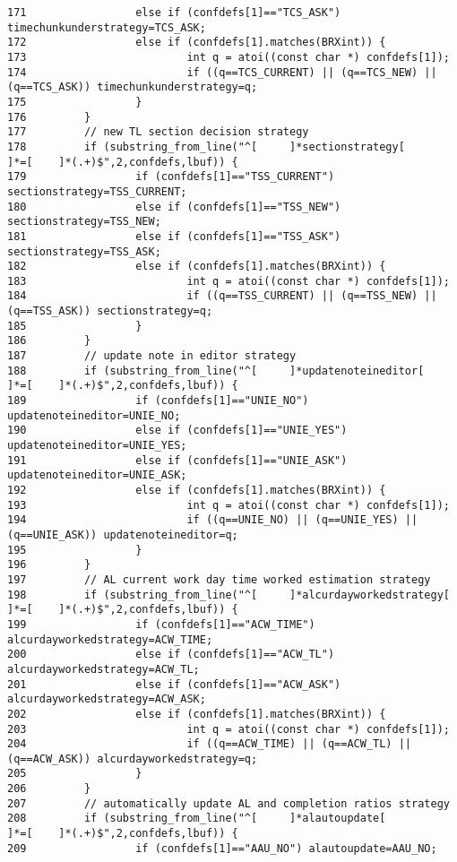 \begin{verbatim}
171                 else if (confdefs[1]=="TCS_ASK") timechunkunderstrategy=TCS_ASK;
172                 else if (confdefs[1].matches(BRXint)) {
173                         int q = atoi((const char *) confdefs[1]);
174                         if ((q==TCS_CURRENT) || (q==TCS_NEW) || (q==TCS_ASK)) timechunkunderstrategy=q;
175                 }
176         }
177         // new TL section decision strategy
178         if (substring_from_line("^[     ]*sectionstrategy[      ]*=[    ]*(.+)$",2,confdefs,lbuf)) {
179                 if (confdefs[1]=="TSS_CURRENT") sectionstrategy=TSS_CURRENT;
180                 else if (confdefs[1]=="TSS_NEW") sectionstrategy=TSS_NEW;
181                 else if (confdefs[1]=="TSS_ASK") sectionstrategy=TSS_ASK;
182                 else if (confdefs[1].matches(BRXint)) {
183                         int q = atoi((const char *) confdefs[1]);
184                         if ((q==TSS_CURRENT) || (q==TSS_NEW) || (q==TSS_ASK)) sectionstrategy=q;
185                 }
186         }
187         // update note in editor strategy
188         if (substring_from_line("^[     ]*updatenoteineditor[   ]*=[    ]*(.+)$",2,confdefs,lbuf)) {
189                 if (confdefs[1]=="UNIE_NO") updatenoteineditor=UNIE_NO;
190                 else if (confdefs[1]=="UNIE_YES") updatenoteineditor=UNIE_YES;
191                 else if (confdefs[1]=="UNIE_ASK") updatenoteineditor=UNIE_ASK;
192                 else if (confdefs[1].matches(BRXint)) {
193                         int q = atoi((const char *) confdefs[1]);
194                         if ((q==UNIE_NO) || (q==UNIE_YES) || (q==UNIE_ASK)) updatenoteineditor=q;
195                 }
196         }
197         // AL current work day time worked estimation strategy
198         if (substring_from_line("^[     ]*alcurdayworkedstrategy[       ]*=[    ]*(.+)$",2,confdefs,lbuf)) {
199                 if (confdefs[1]=="ACW_TIME") alcurdayworkedstrategy=ACW_TIME;
200                 else if (confdefs[1]=="ACW_TL") alcurdayworkedstrategy=ACW_TL;
201                 else if (confdefs[1]=="ACW_ASK") alcurdayworkedstrategy=ACW_ASK;
202                 else if (confdefs[1].matches(BRXint)) {
203                         int q = atoi((const char *) confdefs[1]);
204                         if ((q==ACW_TIME) || (q==ACW_TL) || (q==ACW_ASK)) alcurdayworkedstrategy=q;
205                 }
206         }
207         // automatically update AL and completion ratios strategy
208         if (substring_from_line("^[     ]*alautoupdate[         ]*=[    ]*(.+)$",2,confdefs,lbuf)) {
209                 if (confdefs[1]=="AAU_NO") alautoupdate=AAU_NO;

\end{verbatim}
